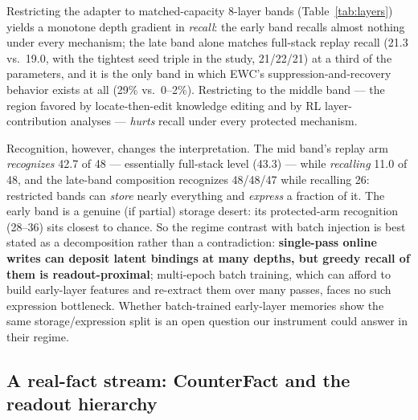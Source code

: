 \documentclass[11pt]{article}
\begin{document}
Restricting the adapter to matched-capacity 8-layer bands (Table~\ref{tab:layers}) yields a monotone
depth gradient in \emph{recall}: the early band recalls almost nothing under every mechanism; the
late band alone matches full-stack replay recall (21.3 vs.\ 19.0, with the tightest seed triple in
the study, 21/22/21) at a third of the parameters, and it is the only band in which EWC's
suppression-and-recovery behavior exists at all (29\% vs.\ 0--2\%). Restricting to the middle band
--- the region favored by locate-then-edit knowledge editing \citep{meng2022rome,meng2023memit} and by
RL layer-contribution analyses \citep{onelayer2026} --- \emph{hurts} recall under every protected
mechanism.

Recognition, however, changes the interpretation. The mid band's replay arm \emph{recognizes} 42.7 of
48 --- essentially full-stack level (43.3) --- while \emph{recalling} 11.0 of 48, and the late-band
composition recognizes 48/48/47 while recalling 26: restricted bands can \emph{store} nearly
everything and \emph{express} a fraction of it. The early band is a genuine (if partial) storage
desert: its protected-arm recognition (28--36) sits closest to chance. So the regime contrast with
batch injection \citep{back2026lora} is best stated as a decomposition rather than a contradiction:
\textbf{single-pass online writes can deposit latent bindings at many depths, but greedy recall of
them is readout-proximal}; multi-epoch batch training, which can afford to build early-layer features
and re-extract them over many passes, faces no such expression bottleneck. Whether batch-trained
early-layer memories show the same storage/expression split is an open question our instrument could
answer in their regime.

\subsection{A real-fact stream: CounterFact and the readout hierarchy}\label{sec:cf}
\end{document}
